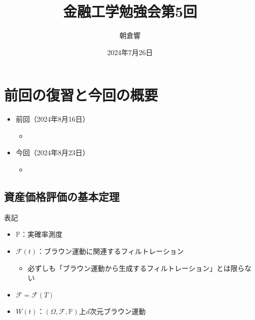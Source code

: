 \documentclass[a4paper, lualatex, ja=standard]{bxjsarticle}
\title{金融工学勉強会第5回}
\author{朝倉響}
\date{2024年7月26日}
\theoremstyle{definition}
\newcommand{\F}{\mathcal{F}}
\renewcommand{\P}{\mathbb{P}}
\begin{document}
\maketitle

\setcounter{section}{2}
\section*{前回の復習と今回の概要}
\begin{itemize}
  \item 前回（2024年8月16日）
  \begin{itemize}
    \item 
  \end{itemize}
  \item 今回（2024年8月23日）
  \begin{itemize}
    \item 
  \end{itemize}
\end{itemize}

\setcounter{section}{5}
\setcounter{subsection}{3}
\subsection{資産価格評価の基本定理}
表記
\begin{itemize}
  \item $\P$：実確率測度
  \item $\F(t)$：ブラウン運動に関連するフィルトレーション
  \begin{itemize}
    \item 必ずしも「ブラウン運動から生成するフィルトレーション」とは限らない
  \end{itemize}
  \item $\F=\F(T)$
  \item $W(t)$：$(\Omega,\F,\P)$上$d$次元ブラウン運動
\end{itemize}
\end{document}
